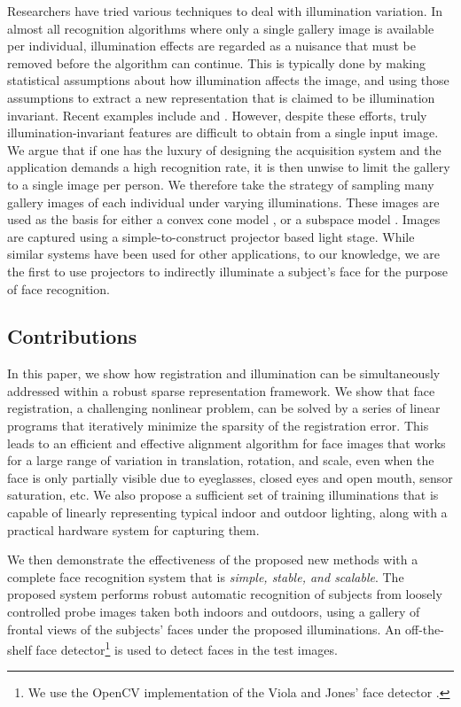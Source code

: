 \documentclass[10pt,journal,letterpaper,compsoc]{IEEEtran}
\begin{document}
Researchers have tried various techniques to deal with illumination variation.
In almost all recognition algorithms where only a single gallery image is
available per individual, illumination effects are regarded as a nuisance that
must be removed before the algorithm can continue.  This is typically done by
making statistical assumptions about how illumination affects the image, and
using those assumptions to extract a new representation that is claimed to be
illumination invariant.  Recent examples include \cite{chen2006total} and
\cite{zhou2007appearance}.  However, despite these efforts, truly
illumination-invariant features are difficult to obtain from a single input
image.  We argue that if one has the luxury of designing the acquisition system
and the application demands a high recognition rate,
it is then unwise to limit the gallery to a
single image per person.  We therefore take the strategy of sampling many
gallery images of each individual under varying illuminations.  These images
are used as the basis for either a convex cone model
\cite{Georghiades2001-PAMI,belhumeur1998set}, or a subspace model
\cite{Basri2003-PAMI}.  Images are captured using a simple-to-construct
projector based light stage.  While similar systems have been used for
other applications, to our knowledge, we
are the first to use projectors to indirectly illuminate a subject's face for
the purpose of face recognition.
\subsection{Contributions} In this paper, we show how
registration and illumination
can be simultaneously addressed within a robust sparse representation
framework. We show that face registration, a challenging
nonlinear problem, can be solved by a series of linear programs
that iteratively minimize the sparsity of the registration
error. This leads to an efficient and effective alignment
algorithm for face images that works for a large range of
variation in translation, rotation, and scale, even when
the face is only partially visible due to eyeglasses, closed
eyes and open mouth, sensor saturation, etc.  We also propose a
sufficient set of training illuminations
that is capable of linearly representing typical indoor and outdoor
lighting, along with a practical hardware system for capturing
them.

We then demonstrate the effectiveness of the proposed new
methods with a complete face recognition system that is {\em
simple, stable, and scalable}. The proposed system performs
robust automatic recognition of subjects from loosely
controlled probe images taken both indoors and outdoors,
using a gallery of
frontal views of the subjects' faces under the proposed
illuminations. An off-the-shelf face
detector\footnote{We use the OpenCV
implementation of the Viola and Jones' face detector
\cite{Viola2004-IJCV}.} is used to detect faces in the test images.
\end{document}
